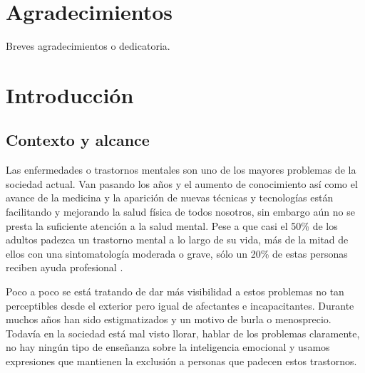 \documentclass[12pt, a4paper,twoside,titlepage]{book}
\let\origdoublepage\cleardoublepage
\renewcommand{\cleardoublepage}{\clearpage{\pagestyle{empty}\origdoublepage}}
\begin{document}
\chapter*{Agradecimientos}

Breves agradecimientos o dedicatoria.



{
  \setlength{\parskip}{1pt}

  \cleardoublepage
  \tableofcontents

  \cleardoublepage
  \listoftables

  \cleardoublepage
  \listoffigures
}


\cleardoublepage
{}
\setcounter{page}{1}

\chapter{Introducción}


\section{Contexto y alcance}

Las enfermedades o trastornos mentales son uno de los mayores problemas de la sociedad actual. Van pasando los años y el aumento de conocimiento así como el avance de la medicina y la aparición de nuevas técnicas y tecnologías están facilitando y mejorando la salud física de todos nosotros, sin embargo aún no se presta la suficiente atención a la salud mental. Pese a que casi el 50\% de los adultos padezca un trastorno mental a lo largo de su vida, más de la mitad de ellos con una sintomatología moderada o grave, sólo un 20\% de estas personas reciben ayuda profesional \cite{articuloIntro1}. 

Poco a poco se está tratando de dar más visibilidad a estos problemas no tan perceptibles desde el exterior pero igual de afectantes e incapacitantes. Durante muchos años han sido estigmatizados y un motivo de burla o menosprecio. Todavía en la sociedad está mal visto llorar, hablar de los problemas claramente, no hay ningún tipo de enseñanza sobre la inteligencia emocional y usamos expresiones que mantienen la exclusión a personas que padecen estos trastornos.  
\end{document}
